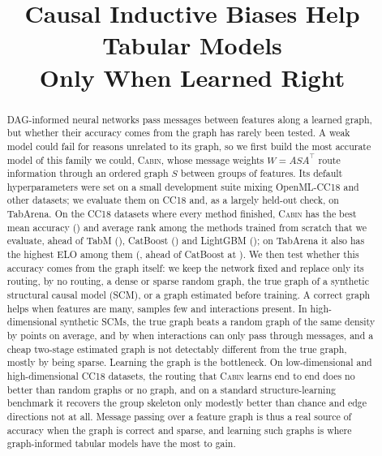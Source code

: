 \documentclass[anon,12pt]{clear2027} %
\title[Causal Inductive Biases for Tabular Models]{Causal Inductive Biases Help Tabular Models\\Only When Learned Right}
\newcommand{\Cabin}{\textsc{Cabin}}
\newcommand{\T}{^{\top}}
\begin{document}
\maketitle

\begin{abstract}%
DAG-informed neural networks pass messages between features along a learned graph, but whether their accuracy comes from the graph has rarely been tested. A weak model could fail for reasons unrelated to its graph, so we first build the most accurate model of this family we could, \Cabin{}, whose message weights $W=ASA\T$ route information through an ordered graph $S$ between groups of features. Its default hyperparameters were set on a small development suite mixing OpenML-CC18 and other datasets; we evaluate them on CC18 and, as a largely held-out check, on TabArena. On the \NCCtasks{} CC18 datasets where every method finished, \Cabin{} has the best mean accuracy (\CCCabin{}) and average rank among the methods trained from scratch that we evaluate, ahead of TabM (\CCTabM{}), CatBoost (\CCCatBoost{}) and LightGBM (\CCLightGBM{}); on TabArena it also has the highest ELO among them (\TAcabin{}, ahead of CatBoost at \TAcatboost{}). We then test whether this accuracy comes from the graph itself: we keep the network fixed and replace only its routing, by no routing, a dense or sparse random graph, the true graph of a synthetic structural causal model (SCM), or a graph estimated before training. A correct graph helps when features are many, samples few and interactions present. In high-dimensional synthetic SCMs, the true graph beats a random graph of the same density by \SynHighTrueRandTrueAbs{} points on average, and by \SynHighAddTrueRandTrueLamOneAbs{} when interactions can only pass through messages, and a cheap two-stage estimated graph is not detectably different from the true graph, mostly by being sparse. Learning the graph is the bottleneck. On \RealNLow{} low-dimensional and \RealNHigh{} high-dimensional CC18 datasets, the routing that \Cabin{} learns end to end does no better than random graphs or no graph, and on a standard structure-learning benchmark it recovers the group skeleton only modestly better than chance and edge directions not at all. Message passing over a feature graph is thus a real source of accuracy when the graph is correct and sparse, and learning such graphs is where graph-informed tabular models have the most to gain.
\end{abstract}
\end{document}
